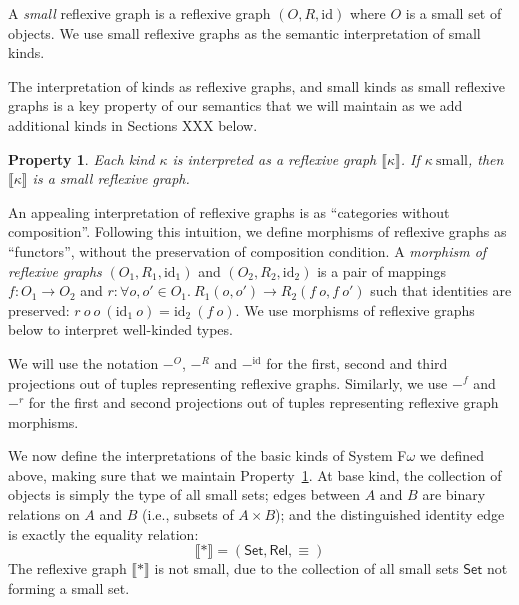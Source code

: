 \documentclass[preprint]{sigplanconf}
\newtheorem{property}{Property}
\theoremstyle{examplestyle}
\newcommand{\sem}[1]{\llbracket #1 \rrbracket}
\newcommand{\Set}{\mathsf{Set}}
\newcommand{\Rel}{\mathsf{Rel}}
\begin{document}
A \emph{small} reflexive graph is a reflexive graph $(O, R,
\mathrm{id})$ where $O$ is a small set of objects. We use small
reflexive graphs as the semantic interpretation of small kinds.

The interpretation of kinds as reflexive graphs, and small kinds as
small reflexive graphs is a key property of our semantics that we will
maintain as we add additional kinds in Sections XXX below.

\begin{property}\label{property:semantic-kinds}
  Each kind $\kappa$ is interpreted as a reflexive graph
  $\sem{\kappa}$. If $\kappa~\mathrm{small}$, then $\sem{\kappa}$ is a
  small reflexive graph.
\end{property}

An appealing interpretation of reflexive graphs is as ``categories
without composition''. Following this intuition, we define morphisms
of reflexive graphs as ``functors'', without the preservation of
composition condition. A \emph{morphism of reflexive graphs}
$(O_1,R_1,\mathrm{id}_1)$ and $(O_2, R_2, \mathrm{id}_2)$ is a pair of
mappings $f : O_1 \to O_2$ and $r : \forall o, o' \in
O_1.~R_1(o,o') \to R_2(f~o, f~o')$ such that identities are
preserved: $r~o~o~(\mathrm{id}_1~o) = \mathrm{id}_2~(f~o)$. We use
morphisms of reflexive graphs below to interpret well-kinded types.

We will use the notation $-^O$, $-^R$ and $-^{\mathrm{id}}$ for the
first, second and third projections out of tuples representing
reflexive graphs. Similarly, we use $-^f$ and $-^r$ for the first and
second projections out of tuples representing reflexive graph
morphisms.

We now define the interpretations of the basic kinds of System
F$\omega$ we defined above, making sure that we maintain
Property~\ref{property:semantic-kinds}. At base kind, the collection
of objects is simply the type of all small sets; edges between $A$ and
$B$ are binary relations on $A$ and $B$ (i.e., subsets of $A \times
B$); and the distinguished identity edge is exactly the equality
relation:
\begin{displaymath}
  \sem{*} = (\Set, \Rel, \equiv)
\end{displaymath}
The reflexive graph $\sem{*}$ is not small, due to the collection of
all small sets $\Set$ not forming a small set.
\end{document}
